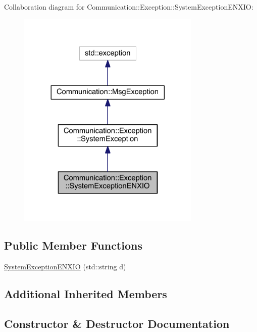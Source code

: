 Collaboration diagram for Communication\+:\+:Exception\+:\+:System\+Exception\+E\+N\+X\+I\+O\+:\nopagebreak
\begin{figure}[H]
\begin{center}
\leavevmode
\includegraphics[width=248pt]{class_communication_1_1_exception_1_1_system_exception_e_n_x_i_o__coll__graph}
\end{center}
\end{figure}
\subsection*{Public Member Functions}
\begin{DoxyCompactItemize}
\item 
\hyperlink{class_communication_1_1_exception_1_1_system_exception_e_n_x_i_o_af1160b699603989d217594dfc4ddb619}{System\+Exception\+E\+N\+X\+I\+O} (std\+::string d)
\end{DoxyCompactItemize}
\subsection*{Additional Inherited Members}


\subsection{Constructor \& Destructor Documentation}
\hypertarget{class_communication_1_1_exception_1_1_system_exception_e_n_x_i_o_af1160b699603989d217594dfc4ddb619}{}

